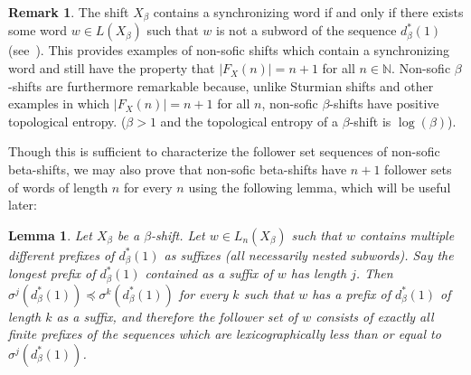 \documentclass{amsart}
\newtheorem{lemma}[theorem]{Lemma}
\theoremstyle{definition}
\newtheorem{remark}[theorem]{Remark}
\numberwithin{equation}{section}
\begin{document}
\begin{remark} 
The shift $X_\beta$ contains a synchronizing word if and only if there exists some word $w \in L(X_\beta)$ such that $w$ is not a subword of the sequence $d_\beta^* (1)$ (see~\cite{Blanchard}). This provides examples of non-sofic shifts which contain a synchronizing word and still have the property that $|F_X(n)| = n+1$ for all $n \in \mathbb{N}$. Non-sofic $\beta$-shifts are furthermore remarkable because, unlike Sturmian shifts and other examples in which $|F_X(n)| = n+1$ for all $n$, non-sofic $\beta$-shifts have positive topological entropy. ($\beta > 1$ and the topological entropy of a $\beta$-shift is $\log(\beta)$).
\end{remark}

Though this is sufficient to characterize the follower set sequences of non-sofic beta-shifts, we may also prove that non-sofic beta-shifts have $n+1$ follower sets of words of length $n$ for every $n$ using the following lemma, which will be useful later:

\begin{lemma}\label{prefixes} Let $X_\beta$ be a $\beta$-shift. Let $w \in L_n(X_\beta)$ such that $w$ contains multiple different prefixes of $d_\beta^* (1)$ as suffixes (all necessarily nested subwords). Say the longest prefix of $d_\beta^* (1)$ contained as a suffix of $w$ has length $j$. Then $\sigma^j(d_\beta^* (1)) \preceq \sigma^k(d_\beta^* (1))$ for every $k$ such that $w$ has a prefix of $d_\beta^* (1)$ of length $k$ as a suffix, and therefore the follower set of $w$ consists of exactly all finite prefixes of the sequences which are lexicographically less than or equal to $\sigma^j(d_\beta^* (1))$.
\end{lemma}
\end{document}
